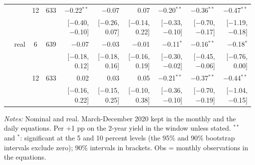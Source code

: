 \begin{longtable}{llcrrrrrrr}
 &  & 12 & 633 & $-$0.22$^{**}$ & $-$0.07 & 0.07 & $-$0.20$^{**}$ & $-$0.36$^{**}$ & $-$0.47$^{**}$\\
 & & & & {\scriptsize [$-$0.40, $-$0.10]} & {\scriptsize [$-$0.26, 0.07]} & {\scriptsize [$-$0.14, 0.22]} & {\scriptsize [$-$0.33, $-$0.10]} & {\scriptsize [$-$0.70, $-$0.17]} & {\scriptsize [$-$1.19, $-$0.18]}\\
 & real & 6 & 639 & $-$0.07 & $-$0.03 & $-$0.01 & $-$0.11$^{*}$ & $-$0.16$^{**}$ & $-$0.18$^{*}$\\
 & & & & {\scriptsize [$-$0.18, 0.12]} & {\scriptsize [$-$0.18, 0.16]} & {\scriptsize [$-$0.16, 0.19]} & {\scriptsize [$-$0.30, $-$0.02]} & {\scriptsize [$-$0.45, $-$0.06]} & {\scriptsize [$-$0.76, 0.00]}\\
 &  & 12 & 633 & 0.02 & 0.03 & 0.05 & $-$0.21$^{**}$ & $-$0.37$^{**}$ & $-$0.44$^{**}$\\
 & & & & {\scriptsize [$-$0.16, 0.22]} & {\scriptsize [$-$0.15, 0.25]} & {\scriptsize [$-$0.10, 0.38]} & {\scriptsize [$-$0.36, $-$0.10]} & {\scriptsize [$-$0.70, $-$0.19]} & {\scriptsize [$-$1.04, $-$0.15]}\\
\end{longtable}
\begin{flushleft}\footnotesize\textit{Notes:} Nominal and real. March-December 2020 kept in the monthly and the daily equations. Per +1 pp on the 2-year yield in the window unless stated. $^{**}$ and $^{*}$: significant at the 5 and 10 percent levels (the 95\% and 90\% bootstrap intervals exclude zero); 90\% intervals in brackets. Obs = monthly observations in the equations.\end{flushleft}
\endgroup
